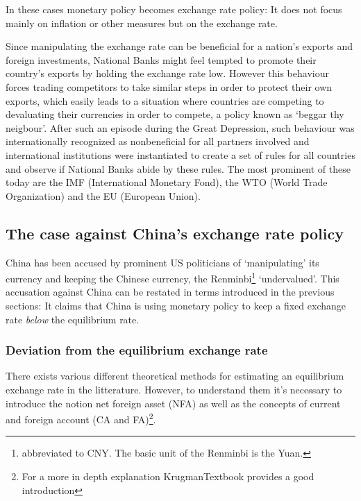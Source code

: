 \documentclass[11pt]{article}
\begin{document}
In these cases monetary policy becomes exchange rate policy: It does not focus mainly on inflation or other measures but on the exchange rate.

Since manipulating the 
exchange rate can be beneficial for a nation's exports and 
foreign investments, National Banks might feel tempted to promote their country's exports by holding the exchange rate low. However this behaviour forces trading competitors 
to take similar steps in order to protect their own exports, which 
easily leads to a situation where countries are competing to devaluating 
their currencies in order to compete, a policy known as `beggar thy neigbour'. After such an episode during the Great Depression, such behaviour was internationally recognized as nonbeneficial for all partners involved and international 
institutions were instantiated to create a set of rules for all countries and observe if National Banks abide by these rules. The most prominent of these today are the IMF (International 
Monetary Fond), the WTO (World Trade Organization) and the EU (European 
Union).



\subsection{The case against China's exchange rate policy}

China has been 
accused by prominent US politicians of `manipulating' its currency and 
keeping the Chinese currency, the Renminbi\footnote{abbreviated to CNY. 
The basic unit of the Renminbi is the Yuan.} `undervalued'. This accusation against China can be restated in terms introduced in the previous sections: It claims that China is using monetary policy to keep a 
fixed exchange rate \emph{below} the equilibrium rate. 

\subsubsection{Deviation from the equilibrium exchange rate}

There exists various different theoretical methods for estimating an 
equilibrium exchange rate in the litterature. However, to understand 
them it's necessary to introduce the notion net foreign asset (NFA) as 
well as the concepts of current and foreign account (CA and 
FA)\footnote{For a more in depth explanation \cite{ch.  
18}{KrugmanTextbook} provides a good introduction}.
\end{document}
